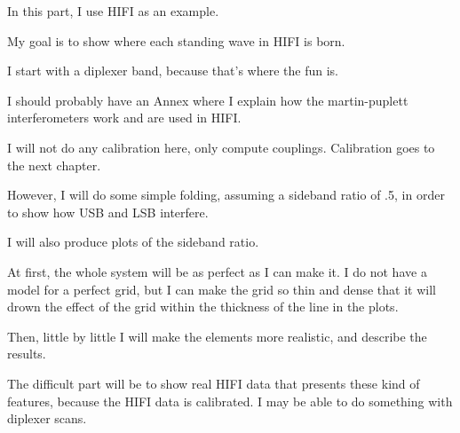In this part, I use HIFI as an example.

My goal is to show where each standing wave in HIFI is born.

I start with a diplexer band, because that's where the fun is.

I should probably have an Annex where I explain how the martin-puplett interferometers work and are used in HIFI.

I will not do any calibration here, only compute couplings.  Calibration goes to the next chapter.

However, I will do some simple folding, assuming a sideband ratio of .5, in order to show how USB and LSB interfere.

I will also produce plots of the sideband ratio.

At first, the whole system will be as perfect as I can make it.  I do not have a model for a perfect grid, but I can make the grid so thin and dense that it will drown the effect of the grid within the thickness of the line in the plots.

Then, little by little I will make the elements more realistic, and describe the results.

The difficult part will be to show real HIFI data that presents these kind of features, because the HIFI data is calibrated.  I may be able to do something with diplexer scans.

